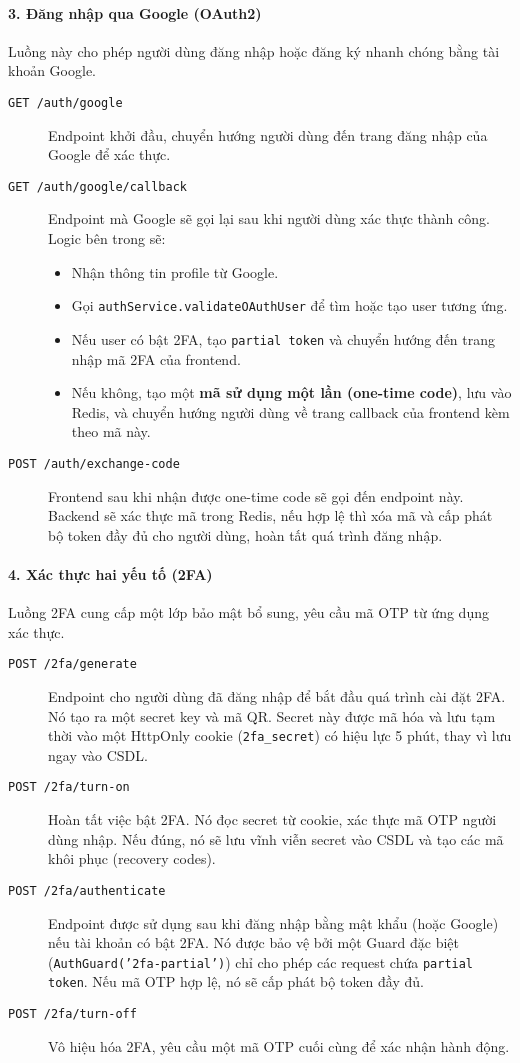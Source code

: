 \paragraph{3. Đăng nhập qua Google (OAuth2)}
Luồng này cho phép người dùng đăng nhập hoặc đăng ký nhanh chóng bằng tài khoản Google.
\begin{description}
    \item[\texttt{GET /auth/google}] Endpoint khởi đầu, chuyển hướng người dùng đến trang đăng nhập của Google để xác thực.
    \item[\texttt{GET /auth/google/callback}] Endpoint mà Google sẽ gọi lại sau khi người dùng xác thực thành công. Logic bên trong sẽ:
    \begin{itemize}
        \item Nhận thông tin profile từ Google.
        \item Gọi \texttt{authService.validateOAuthUser} để tìm hoặc tạo user tương ứng.
        \item Nếu user có bật 2FA, tạo \texttt{partial token} và chuyển hướng đến trang nhập mã 2FA của frontend.
        \item Nếu không, tạo một \textbf{mã sử dụng một lần (one-time code)}, lưu vào Redis, và chuyển hướng người dùng về trang callback của frontend kèm theo mã này.
    \end{itemize}
    \item[\texttt{POST /auth/exchange-code}] Frontend sau khi nhận được one-time code sẽ gọi đến endpoint này. Backend sẽ xác thực mã trong Redis, nếu hợp lệ thì xóa mã và cấp phát bộ token đầy đủ cho người dùng, hoàn tất quá trình đăng nhập.
\end{description}

\paragraph{4. Xác thực hai yếu tố (2FA)}
Luồng 2FA cung cấp một lớp bảo mật bổ sung, yêu cầu mã OTP từ ứng dụng xác thực.
\begin{description}
    \item[\texttt{POST /2fa/generate}] Endpoint cho người dùng đã đăng nhập để bắt đầu quá trình cài đặt 2FA. Nó tạo ra một secret key và mã QR. Secret này được mã hóa và lưu tạm thời vào một HttpOnly cookie (\texttt{2fa\_secret}) có hiệu lực 5 phút, thay vì lưu ngay vào CSDL.
    \item[\texttt{POST /2fa/turn-on}] Hoàn tất việc bật 2FA. Nó đọc secret từ cookie, xác thực mã OTP người dùng nhập. Nếu đúng, nó sẽ lưu vĩnh viễn secret vào CSDL và tạo các mã khôi phục (recovery codes).
    \item[\texttt{POST /2fa/authenticate}] Endpoint được sử dụng sau khi đăng nhập bằng mật khẩu (hoặc Google) nếu tài khoản có bật 2FA. Nó được bảo vệ bởi một Guard đặc biệt (\texttt{AuthGuard('2fa-partial')}) chỉ cho phép các request chứa \texttt{partial token}. Nếu mã OTP hợp lệ, nó sẽ cấp phát bộ token đầy đủ.
    \item[\texttt{POST /2fa/turn-off}] Vô hiệu hóa 2FA, yêu cầu một mã OTP cuối cùng để xác nhận hành động.
\end{description}